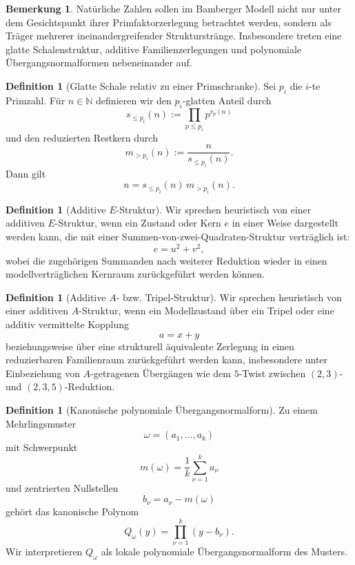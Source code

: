 \documentclass[11pt,a4paper]{article}
\theoremstyle{definition}
\newtheorem{definition}[satz]{Definition}
\newtheorem{bemerkung}[satz]{Bemerkung}
\begin{document}
\begin{bemerkung}
Natürliche Zahlen sollen im Bamberger Modell nicht nur unter dem Gesichtspunkt ihrer Primfaktorzerlegung betrachtet werden, sondern als Träger mehrerer ineinandergreifender Strukturstränge. Insbesondere treten eine glatte Schalenstruktur, additive Familienzerlegungen und polynomiale Übergangsnormalformen nebeneinander auf.
\end{bemerkung}

\begin{definition}[Glatte Schale relativ zu einer Primschranke]
Sei \(p_i\) die \(i\)-te Primzahl. Für \(n\in\mathbb N\) definieren wir den \(p_i\)-glatten Anteil durch
\[
s_{\le p_i}(n):=\prod_{p\le p_i} p^{v_p(n)}
\]
und den reduzierten Restkern durch
\[
m_{>p_i}(n):=\frac{n}{s_{\le p_i}(n)}.
\]
Dann gilt
\[
n=s_{\le p_i}(n)\,m_{>p_i}(n).
\]
\end{definition}

\begin{definition}[Additive \(E\)-Struktur]
Wir sprechen heuristisch von einer additiven \(E\)-Struktur, wenn ein Zustand oder Kern \(e\) in einer Weise dargestellt werden kann, die mit einer Summen-von-zwei-Quadraten-Struktur verträglich ist:
\[
e=u^2+v^2,
\]
wobei die zugehörigen Summanden nach weiterer Reduktion wieder in einen modellverträglichen Kernraum zurückgeführt werden können.
\end{definition}

\begin{definition}[Additive \(A\)- bzw. Tripel-Struktur]
Wir sprechen heuristisch von einer additiven \(A\)-Struktur, wenn ein Modellzustand über ein Tripel oder eine additiv vermittelte Kopplung
\[
a=x+y
\]
beziehungsweise über eine strukturell äquivalente Zerlegung in einen reduzierbaren Familienraum zurückgeführt werden kann, insbesondere unter Einbeziehung von \(A\)-getragenen Übergängen wie dem \(5\)-Twist zwischen \((2,3)\)- und \((2,3,5)\)-Reduktion.
\end{definition}

\begin{definition}[Kanonische polynomiale Übergangsnormalform]
Zu einem Mehrlingsmuster
\[
\omega=(a_1,\dots,a_k)
\]
mit Schwerpunkt
\[
m(\omega)=\frac{1}{k}\sum_{\nu=1}^k a_\nu
\]
und zentrierten Nullstellen
\[
b_\nu=a_\nu-m(\omega)
\]
gehört das kanonische Polynom
\[
Q_\omega(y)=\prod_{\nu=1}^k (y-b_\nu).
\]
Wir interpretieren \(Q_\omega\) als lokale polynomiale Übergangsnormalform des Musters.
\end{definition}
\end{document}
